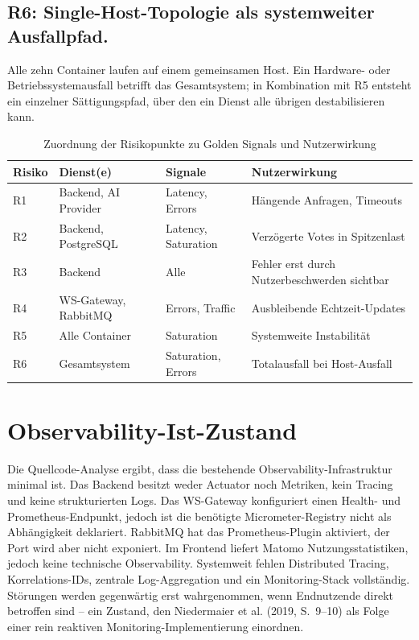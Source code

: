\subsection{R6: Single-Host-Topologie als systemweiter Ausfallpfad.}
Alle zehn Container laufen auf einem gemeinsamen Host. Ein Hardware- oder Betriebssystemausfall betrifft das Gesamtsystem; in Kombination mit R5 entsteht ein einzelner Sättigungspfad, über den ein Dienst alle übrigen destabilisieren kann.
 
\begin{table}[ht]
\centering
\caption{Zuordnung der Risikopunkte zu Golden Signals und Nutzerwirkung}
\label{tab:risiken}
\small
\begin{tabularx}{\textwidth}{l l l X}
\toprule
\textbf{Risiko} & \textbf{Dienst(e)} & \textbf{Signale} & \textbf{Nutzerwirkung} \\
\midrule
R1 & Backend, AI Provider & Latency, Errors & Hängende Anfragen, Timeouts \\
R2 & Backend, PostgreSQL & Latency, Saturation & Verzögerte Votes in Spitzenlast \\
R3 & Backend & Alle & Fehler erst durch Nutzerbeschwerden sichtbar \\
R4 & WS-Gateway, RabbitMQ & Errors, Traffic & Ausbleibende Echtzeit-Updates \\
R5 & Alle Container & Saturation & Systemweite Instabilität \\
R6 & Gesamtsystem & Saturation, Errors & Totalausfall bei Host-Ausfall \\
\bottomrule
\end{tabularx}
\end{table}
 
 
\section{Observability-Ist-Zustand}
 
Die Quellcode-Analyse ergibt, dass die bestehende Observability-Infrastruktur minimal ist. Das Backend besitzt weder Actuator noch Metriken, kein Tracing und keine strukturierten Logs. Das WS-Gateway konfiguriert einen Health- und Prometheus-Endpunkt, jedoch ist die benötigte Micrometer-Registry nicht als Abhängigkeit deklariert. RabbitMQ hat das Prometheus-Plugin aktiviert, der Port wird aber nicht exponiert. Im Frontend liefert Matomo Nutzungsstatistiken, jedoch keine technische Observability. Systemweit fehlen Distributed Tracing, Korrelations-IDs, zentrale Log-Aggregation und ein Monitoring-Stack vollständig. Störungen werden gegenwärtig erst wahrgenommen, wenn Endnutzende direkt betroffen sind -- ein Zustand, den Niedermaier et al. (2019, S.~9--10) als Folge einer rein reaktiven Monitoring-Implementierung einordnen.
 
